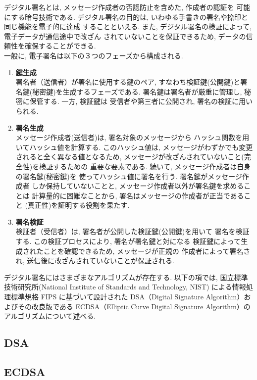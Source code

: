 デジタル署名とは, メッセージ作成者の否認防止を含めた, 作成者の認証を
可能にする暗号技術である. 
デジタル署名の目的は, いわゆる手書きの署名や捺印と同じ機能を電子的に達成
することといえる. また, デジタル署名の検証によって, 電子データが通信途中で改ざん
されていないことを保証できるため, データの信頼性を確保することができる.\\
\indent 一般に, 電子署名は以下の３つのフェーズから構成される.

\begin{enumerate}
  \item \textbf{鍵生成}\\
  \indent 署名者（送信者）が署名に使用する鍵のペア, 
  すなわち検証鍵(公開鍵)と署名鍵(秘密鍵)を生成するフェーズである. 
  署名鍵は署名者が厳重に管理し, 秘密に保管する. 一方, 検証鍵は
  受信者や第三者に公開され, 署名の検証に用いられる.
  \item \textbf{署名生成}\\
  \indent メッセージ作成者(送信者)は, 署名対象のメッセージから
  ハッシュ関数を用いてハッシュ値を計算する. このハッシュ値は, 
  メッセージがわずかでも変更されると全く異なる値となるため, 
  メッセージが改ざんされていないこと(完全性)を検証するための
  重要な要素である. 続いて, メッセージ作成者は自身の署名鍵(秘密鍵)を
  使ってハッシュ値に署名を行う. 署名鍵がメッセージ作成者
  しか保持していないことと, メッセージ作成者以外が署名鍵を求めることは
  計算量的に困難なことから, 署名はメッセージの作成者が正当であること
  (真正性)を証明する役割を果たす. 
  \item \textbf{署名検証}\\
  \indent 検証者（受信者）は, 署名者が公開した検証鍵(公開鍵)を用いて
  署名を検証する. この検証プロセスにより, 署名が署名鍵と対になる
  検証鍵によって生成されたことを確認できるため, メッセージが正規の
  作成者によって署名され, 送信後に改ざんされていないことが保証される.
\end{enumerate}
\indent デジタル署名にはさまざまなアルゴリズムが存在する. 以下の項では,  
国立標準技術研究所(National Institute of Standards and Technology, NIST)
による情報処理標準規格 FIPS に基づいて設計された
DSA（Digital Signature Algorithm）およびその改良版である
ECDSA（Elliptic Curve Digital Signature Algorithm）の
アルゴリズムについて述べる.\\

\subsection{DSA}

\subsection{ECDSA}
